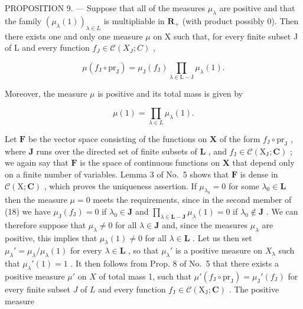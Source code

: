 PROPOSITION 9. --- Suppose that all of the measures \(\mu_{\lambda}\) are positive and that the family \((\mu_{\lambda}(1))_{\lambda \in L}\) is multipliable in \(\mathbf{R}_{+}\) (with product possibly 0). Then there exists one and only one measure \(\mu\) on X such that, for every finite subset J of L and every function \(f_{J} \in \mathcal{C}(X_J; C)\) ,

\[
\mu (f _ {\mathrm{J}} \circ \mathrm{pr} _ {\mathrm{J}}) = \mu_ {\mathrm{J}} (f _ {\mathrm{J}}) \prod_ {\lambda \in \mathrm{L} - \mathrm{J}} \mu_ {\lambda} (1).\tag{18}
\]

Moreover, the measure \(\mu\) is positive and its total mass is given by

\[
\mu (1) = \prod_ {\lambda \in L} \mu_ {\lambda} (1).\tag{19}
\]

Let \(\mathbf{F}\) be the vector space consisting of the functions on \(\mathbf{X}\) of the form \(f_{\mathrm{J}} \circ \mathrm{pr}_{\mathrm{J}}\) , where \(\mathbf{J}\) runs over the directed set of finite subsets of \(\mathbf{L}\) , and \(f_{\mathrm{J}} \in \mathcal{C}(\mathrm{X}_{\mathrm{J}}; \mathbf{C})\) ; we again say that \(\mathbf{F}\) is the space of continuous functions on \(\mathbf{X}\) that depend only on a finite number of variables. Lemma 3 of No.~5 shows that \(\mathbf{F}\) is dense in \(\mathcal{C}(\mathrm{X}; \mathbf{C})\) , which proves the uniqueness assertion. If \(\mu_{\lambda_0} = 0\) for some \(\lambda_0 \in \mathbf{L}\) then the measure \(\mu = 0\) meets the requirements, since in the second member of (18) we have \(\mu_{\mathrm{J}}(f_{\mathrm{J}}) = 0\) if \(\lambda_0 \in \mathbf{J}\) and \(\prod_{\lambda \in \mathbf{L} - \mathbf{J}} \mu_{\lambda}(1) = 0\) if \(\lambda_0 \notin \mathbf{J}\) . We can therefore suppose that \(\mu_{\lambda} \neq 0\) for all \(\lambda \in \mathbf{J}\) and, since the measures \(\mu_{\lambda}\) are positive, this implies that \(\mu_{\lambda}(1) \neq 0\) for all \(\lambda \in \mathbf{L}\) . Let us then set \(\mu_{\lambda}' = \mu_{\lambda}/\mu_{\lambda}(1)\) for every \(\lambda \in \mathbf{L}\) , so that \(\mu_{\lambda}'\) is a positive measure on \(X_{\lambda}\) such that \(\mu_{\lambda}'(1) = 1\) . It then follows from Prop. 8 of No.~5 that there exists a positive measure \(\mu'\) on \(X\) of total mass 1, such that \(\mu'(f_{\mathrm{J}} \circ \mathrm{pr}_{\mathrm{J}}) = \mu_{\mathrm{J}}'(f_{\mathrm{J}})\) for every finite subset \(J\) of \(L\) and every function \(f_{\mathrm{J}} \in \mathcal{C}(\mathrm{X}_{\mathrm{J}}; \mathbf{C})\) . The positive measure

